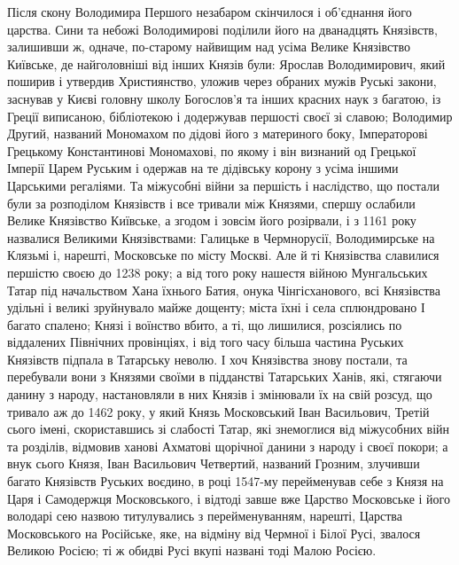 Після скону Володимира Першого незабаром скінчилося і об'єднання його царства.
Сини та небожі Володимирові поділили його на дванадцять Князівств, залишивши ж,
одначе, по-старому найвищим над усіма Велике Князівство Київське, де
найголовніші від інших Князів були: Ярослав Володимирович, який поширив і
утвердив Християнство, уложив через обраних мужів Руські закони, заснував у
Києві головну школу Богослов'я та інших красних наук з багатою, із Греції
виписаною, бібліотекою і додержував першості своєї зі славою; Володимир Другий,
названий Мономахом по дідові його з материного боку, Імператорові Грецькому
Константинові Мономахові, по якому і він визнаний од Грецької Імперії Царем
Руським і одержав на те дідівську корону з усіма іншими Царськими регаліями. Та
міжусобні війни за першість і наслідство, що постали були за розподілом
Князівств і все тривали між Князями, спершу ослабили Велике Князівство
Київське, а згодом і зовсім його розірвали, і з 1161 року назвалися Великими
Князівствами: Галицьке в Чермнорусії, Володимирське на Клязьмі і, нарешті,
Московське по місту Москві. Але й ті Князівства славилися першістю своєю до
1238 року; а від того року нашестя війною Мунгальських Татар під начальством
Хана їхнього Батия, онука Чінгісханового, всі Князівства удільні і великі
зруйнувало майже дощенту; міста їхні і села сплюндровано І багато спалено;
Князі і воїнство вбито, а ті, що лишилися, розсіялись по віддалених Північних
провінціях, і від того часу більша частина Руських Князівств підпала в
Татарську неволю. І хоч Князівства знову постали, та перебували вони з Князями
своїми в підданстві Татарських Ханів, які, стягаючи данину з народу,
настановляли в них Князів і змінювали їх на свій розсуд, що тривало аж до 1462
року, у який Князь Московський Іван Васильович, Третій сього імені,
скориставшись зі слабості Татар, які знемоглися від міжусобних війн та
розділів, відмовив ханові Ахматові щорічної данини з народу і своєї покори; а
внук сього Князя, Іван Васильович Четвертий, названий Грозним, злучивши багато
Князівств Руських воєдино, в році 1547-му перейменував себе з Князя на Царя і
Самодержця Московського, і відтоді завше вже Царство Московське і його володарі
сею назвою титулувались з перейменуванням, нарешті, Царства Московського на
Російське, яке, на відміну від Чермної і Білої Русі, звалося Великою Росією; ті
ж обидві Русі вкупі названі тоді Малою Росією.
